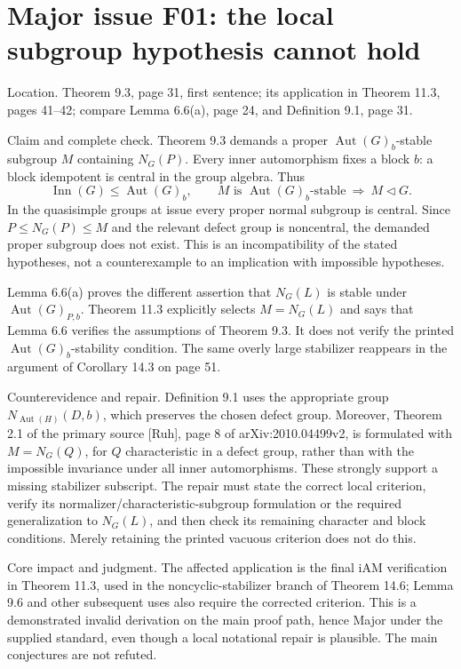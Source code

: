 \documentclass[10pt]{article}
\begin{document}
\section*{Major issue F01: the local subgroup hypothesis cannot hold}
Location. Theorem 9.3, page 31, first sentence; its application in Theorem 11.3, pages 41–42; compare Lemma 6.6(a), page 24, and Definition 9.1, page 31.\par
Claim and complete check. Theorem 9.3 demands a proper \(\operatorname{Aut}(G)_b\)-stable subgroup \(M\) containing \(N_G(P)\). Every inner automorphism fixes a block \(b\): a block idempotent is central in the group algebra. Thus \[\operatorname{Inn}(G)\leq\operatorname{Aut}(G)_b,\qquad
 M\text{ is }\operatorname{Aut}(G)_b\text{-stable}\ \Longrightarrow\ M\lhd G.\] In the quasisimple groups at issue every proper normal subgroup is central. Since \(P\leq N_G(P)\leq M\) and the relevant defect group is noncentral, the demanded proper subgroup does not exist. This is an incompatibility of the stated hypotheses, not a counterexample to an implication with impossible hypotheses.\par
Lemma 6.6(a) proves the different assertion that \(N_G(L)\) is stable under \(\operatorname{Aut}(G)_{P,b}\). Theorem 11.3 explicitly selects \(M=N_G(L)\) and says that Lemma 6.6 verifies the assumptions of Theorem 9.3. It does not verify the printed \(\operatorname{Aut}(G)_b\)-stability condition. The same overly large stabilizer reappears in the argument of Corollary 14.3 on page 51.\par
Counterevidence and repair. Definition 9.1 uses the appropriate group \(N_{\operatorname{Aut}(H)}(D,b)\), which preserves the chosen defect group. Moreover, Theorem 2.1 of the primary source [Ruh], page 8 of arXiv:2010.04499v2, is formulated with \(M=N_G(Q)\), for \(Q\) characteristic in a defect group, rather than with the impossible invariance under all inner automorphisms. These strongly support a missing stabilizer subscript. The repair must state the correct local criterion, verify its normalizer/characteristic-subgroup formulation or the required generalization to \(N_G(L)\), and then check its remaining character and block conditions. Merely retaining the printed vacuous criterion does not do this.\par
Core impact and judgment. The affected application is the final iAM verification in Theorem 11.3, used in the noncyclic-stabilizer branch of Theorem 14.6; Lemma 9.6 and other subsequent uses also require the corrected criterion. This is a demonstrated invalid derivation on the main proof path, hence Major under the supplied standard, even though a local notational repair is plausible. The main conjectures are not refuted.\par
\end{document}
